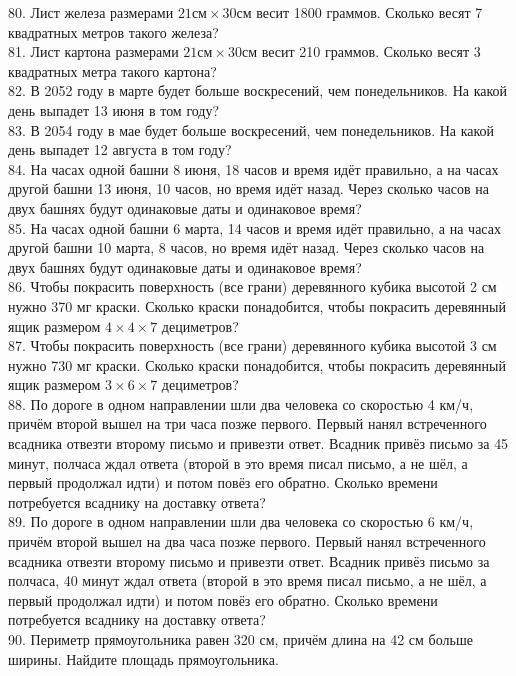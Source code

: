 \documentclass[12pt]{article}
\begin{document}
80. Лист железа размерами $21\text{см}\times30\text{см}$ весит 1800 граммов. Сколько весят 7 квадратных метров такого железа?\\
81. Лист картона размерами $21\text{см}\times30\text{см}$ весит 210 граммов. Сколько весят 3 квадратных метра такого картона?\\
82. В 2052 году в марте будет больше воскресений, чем понедельников. На какой день выпадет 13 июня в том году?\\
83. В 2054 году в мае будет больше воскресений, чем понедельников. На какой день выпадет 12 августа в том году?\\
84. На часах одной башни 8 июня, 18 часов и время идёт правильно, а на часах другой башни 13 июня, 10 часов, но время идёт назад. Через сколько часов на двух башнях будут одинаковые даты и одинаковое время?\\
85. На часах одной башни 6 марта, 14 часов и время идёт правильно, а на часах другой башни 10 марта, 8 часов, но время идёт назад. Через сколько часов на двух башнях будут одинаковые даты и одинаковое время?\\
86. Чтобы покрасить поверхность (все грани) деревянного кубика высотой 2 см нужно 370 мг краски. Сколько краски понадобится, чтобы покрасить деревянный ящик размером $4\times4\times7$ дециметров?\\
87. Чтобы покрасить поверхность (все грани) деревянного кубика высотой 3 см нужно 730 мг краски. Сколько краски понадобится, чтобы покрасить деревянный ящик размером $3\times6\times7$ дециметров?\\
88. По дороге в одном направлении шли два человека со скоростью 4 км/ч, причём второй вышел на три часа позже первого. Первый нанял встреченного всадника отвезти второму письмо и привезти ответ. Всадник привёз письмо за 45 минут, полчаса ждал ответа (второй в это время писал письмо, а не шёл, а первый продолжал идти) и потом повёз его обратно. Сколько времени потребуется всаднику на доставку ответа?\\
89. По дороге в одном направлении шли два человека со скоростью 6 км/ч, причём второй вышел на два часа позже первого. Первый нанял встреченного всадника отвезти второму письмо и привезти ответ. Всадник привёз письмо за полчаса, 40 минут ждал ответа (второй в это время писал письмо, а не шёл, а первый продолжал идти) и потом повёз его обратно. Сколько времени потребуется всаднику на доставку ответа?\\
90. Периметр прямоугольника равен 320 см, причём длина на 42 см больше ширины. Найдите площадь прямоугольника.\\
\end{document}
